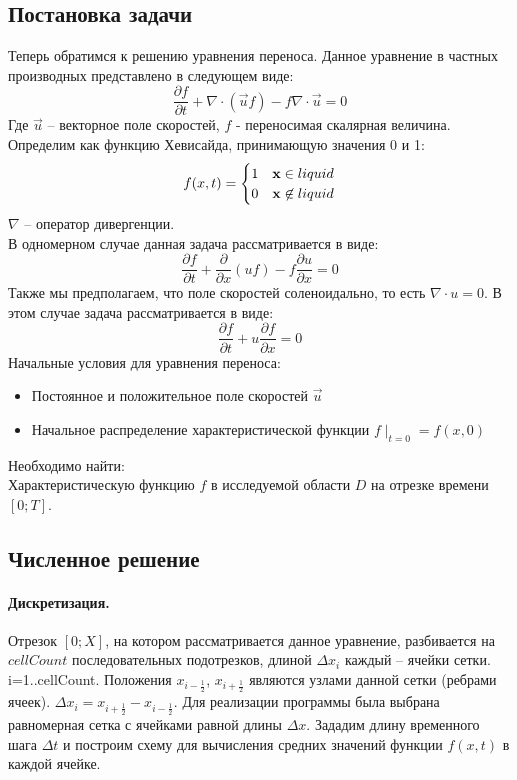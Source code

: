 \documentclass[12pt,a4paper]{article}
\begin{document}
\subsection{Постановка задачи}
Теперь обратимся к решению уравнения переноса.
Данное уравнение в частных производных представлено в следующем виде:
\[
\frac{\partial f}{\partial t}+\nabla\cdot(\overrightarrow{u}f)-f\nabla\cdot\overrightarrow{u}=0
\]
Где $\overrightarrow{u}$ – векторное поле скоростей, $f$ - переносимая скалярная величина. Определим  как функцию Хевисайда, принимающую значения 0 и 1:
\begin{equation}
f(x,t)=\begin{cases}1 & {\bf x}\in liquid \\0 & {\bf x}\not\in liquid\end{cases}
\end{equation}
$\nabla$ – оператор дивергенции.\\
В одномерном случае данная задача рассматривается в виде:
\[
\frac{\partial f}{\partial t}+\frac{\partial }{\partial x}(uf)-f\frac{\partial u}{\partial x}=0
\]
Также мы предполагаем, что поле скоростей  соленоидально, то есть $\nabla\cdot u=0$. В этом случае задача рассматривается в виде:
\[
\frac{\partial f}{\partial t}+u\frac{\partial f}{\partial x}=0
\]
Начальные условия для уравнения переноса:
\begin{itemize}
	\item {Постоянное и положительное поле скоростей $\overrightarrow{u}$}
	\item Начальное распределение характеристической функции $f\mid_{t=0}=f(x,0)$
\end{itemize}
Необходимо найти:\\
Характеристическую функцию $f$ в исследуемой области $D$ на отрезке времени $[0; T]$.

\subsection{Численное решение}

\paragraph{Дискретизация.}
Отрезок $[0;X]$, на котором рассматривается данное уравнение, разбивается на $cellCount$ последовательных подотрезков, длиной $\Delta x_i$ каждый – ячейки сетки. i=1..cellCount. Положения $x_{i-\frac{1}{2}}$, $x_{i+\frac{1}{2}}$ являются узлами данной сетки (ребрами ячеек). $\Delta x_i=x_{i+\frac{1}{2}}-x_{i-\frac{1}{2}}$. Для реализации программы была выбрана равномерная сетка с ячейками равной длины $\Delta x$. Зададим длину временного шага $\Delta t$ и построим схему для вычисления средних значений функции $f(x,t)$ в каждой ячейке.\\
\end{document}
